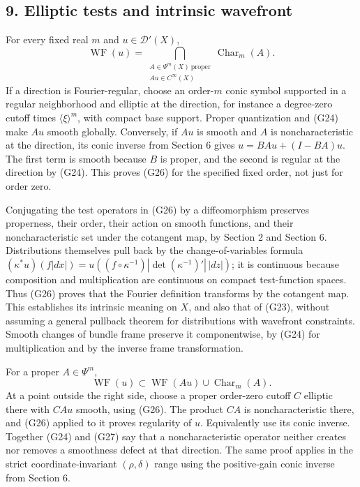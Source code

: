 \documentclass[
  11pt,
]{article}
\begin{document}
\subsection{9. Elliptic tests and intrinsic
wavefront}\label{elliptic-tests-and-intrinsic-wavefront}

For every fixed real \(m\) and \(u\in\mathcal D'(X)\), \[
\operatorname{WF}(u)=
\bigcap_{\substack{A\in\Psi^m(X)\ \mathrm{proper}\\Au\in C^\infty(X)}}
\operatorname{Char}_m(A).
\tag{G26}
\] If a direction is Fourier-regular, choose an order-\(m\) conic symbol
supported in a regular neighborhood and elliptic at the direction, for
instance a degree-zero cutoff times \(\langle\xi\rangle^m\), with
compact base support. Proper quantization and (G24) make \(Au\) smooth
globally. Conversely, if \(Au\) is smooth and \(A\) is noncharacteristic
at the direction, its conic inverse from Section 6 gives
\(u=BAu+(I-BA)u\). The first term is smooth because \(B\) is proper, and
the second is regular at the direction by (G24). This proves (G26) for
the specified fixed order, not just for order zero.

Conjugating the test operators in (G26) by a diffeomorphism preserves
properness, their order, their action on smooth functions, and their
noncharacteristic set under the cotangent map, by Section 2 and Section
6. Distributions themselves pull back by the change-of-variables formula
\((\kappa^*u)(f|dx|)=u((f\circ\kappa^{-1})|\det(\kappa^{-1})'|\,|dz|)\);
it is continuous because composition and multiplication are continuous
on compact test-function spaces. Thus (G26) proves that the Fourier
definition transforms by the cotangent map. This establishes its
intrinsic meaning on \(X\), and also that of (G23), without assuming a
general pullback theorem for distributions with wavefront constraints.
Smooth changes of bundle frame preserve it componentwise, by (G24) for
multiplication and by the inverse frame transformation.

For a proper \(A\in\Psi^m\), \[
\operatorname{WF}(u)\subset\operatorname{WF}(Au)\cup\operatorname{Char}_m(A).
\tag{G27}
\] At a point outside the right side, choose a proper order-zero cutoff
\(C\) elliptic there with \(CAu\) smooth, using (G26). The product
\(CA\) is noncharacteristic there, and (G26) applied to it proves
regularity of \(u\). Equivalently use its conic inverse. Together (G24)
and (G27) say that a noncharacteristic operator neither creates nor
removes a smoothness defect at that direction. The same proof applies in
the strict coordinate-invariant \((\rho,\delta)\) range using the
positive-gain conic inverse from Section 6.
\end{document}
